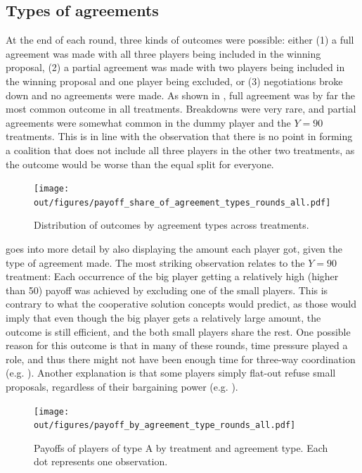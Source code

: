 \documentclass[12pt]{article}
\begin{document}
\subsection{Types of agreements}

At the end of each round, three kinds of outcomes were possible: either (1) a full agreement was made with all three players being included in the winning proposal, (2) a partial agreement was made with two players being included in the winning proposal and one player being excluded, or (3) negotiations broke down and no agreements were made. As shown in , full agreement was by far the most common outcome in all treatments. Breakdowns were very rare, and partial agreements were somewhat common in the dummy player and the $Y=90$ treatments. This is in line with the observation that there is no point in forming a coalition that does not include all three players in the other two treatments, as the outcome would be worse than the equal split for everyone.

\begin{figure}
    \centering
    \texttt{[image: out/figures/payoff\_share\_of\_agreement\_types\_rounds\_all.pdf]}
    \caption{Distribution of outcomes by agreement types across treatments.}
    \label{fig:agreement_types}
\end{figure}

 goes into more detail by also displaying the amount each player got, given the type of agreement made. The most striking observation relates to the $Y=90$ treatment: Each occurrence of the big player getting a relatively high (higher than 50) payoff was achieved by excluding one of the small players. This is contrary to what the cooperative solution concepts would predict, as those would imply that even though the big player gets a relatively large amount, the outcome is still efficient, and the both small players share the rest. One possible reason for this outcome is that in many of these rounds, time pressure played a role, and thus there might not have been enough time for three-way coordination (e.g. ). Another explanation is that some players simply flat-out refuse small proposals, regardless of their bargaining power (e.g. ).

\begin{figure}
    \centering
    \texttt{[image: out/figures/payoff\_by\_agreement\_type\_rounds\_all.pdf]}
    \caption{Payoffs of players of type A by treatment and agreement type. Each dot represents one observation.}
    \label{fig:payoff_by_agreement}
\end{figure}
\end{document}
